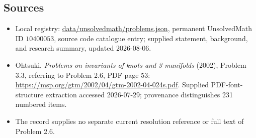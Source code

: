 \documentclass[11pt]{article}
\begin{document}
\subsection{Sources}
\begin{itemize}
\item Local registry: \url{data/unsolvedmath/problems.json}, permanent UnsolvedMath ID \(10400053\), source code catalogue entry; supplied statement, background, and research summary, updated 2026-08-06.
\item Ohtsuki, \emph{Problems on invariants of knots and 3-manifolds} (2002), Problem 3.3, referring to Problem 2.6, PDF page 53: \url{https://msp.org/gtm/2002/04/gtm-2002-04-024s.pdf}. Supplied PDF-font-structure extraction accessed 2026-07-29; provenance distinguishes 231 numbered items.
\item The record supplies no separate current resolution reference or full text of Problem 2.6.
\end{itemize}
\end{document}
